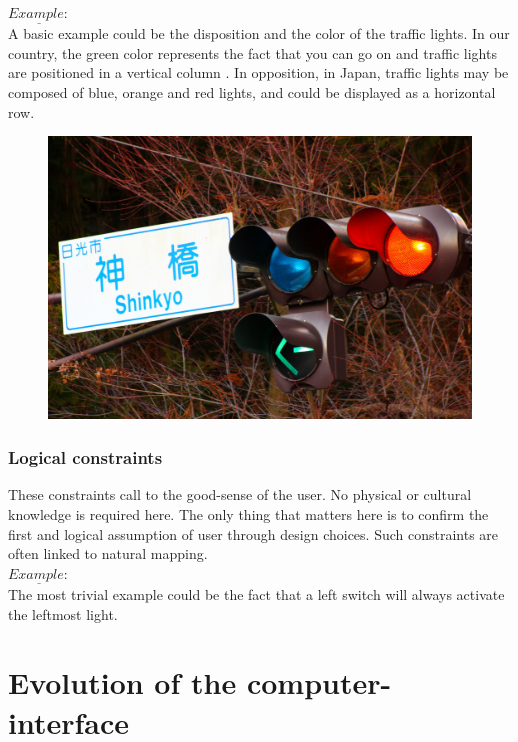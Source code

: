 \documentclass[a4paper,11pt] {article}
\theoremstyle{definition}
\begin{document}
        $\underline{Example:}$\\
        A basic example could be the disposition and the color of the traffic lights. In our country, the green color represents the fact that you can go on and traffic lights are positioned in a vertical column . In opposition, in Japan, traffic lights may be composed of blue, orange and red lights, and could be displayed as a horizontal row.
        \begin{figure}[h]
        \centering
        \includegraphics[scale=0.1]{fig-report/japan-traffic-light.jpg}
        \end{figure}
 
        \subsubsection{Logical constraints}
        These constraints call to the good-sense of the user. No physical or cultural knowledge is required here. The only thing that matters here is to confirm the first and logical assumption of user through design choices. Such constraints are often linked to natural mapping.\\
       
        $\underline{Example:}$\\
        The most trivial example could be the fact that a left switch will always activate the leftmost light.
        



\section{Evolution of the computer-interface}
\label{sct:history}
\end{document}
